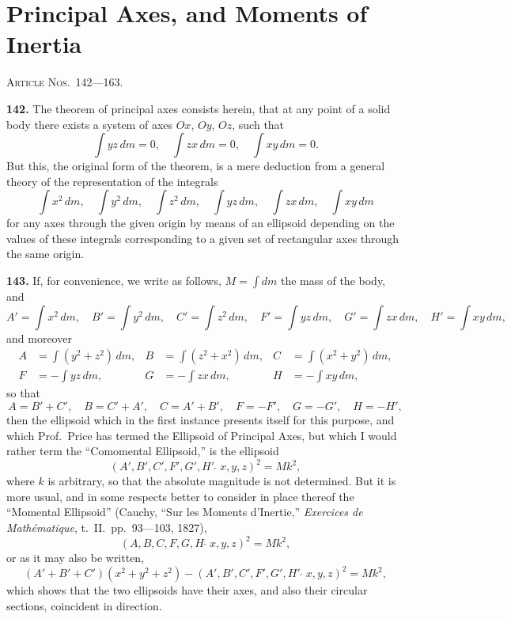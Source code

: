 \documentclass[11pt,a4paper]{article}
\theoremstyle{definition}
\begin{document}
\section*{Principal Axes, and Moments of Inertia}
\noindent\textsc{Article Nos.~142---163.}

\medskip

\textbf{142.} The theorem of principal axes consists herein, that at any point of a solid body there exists a system of axes $Ox$, $Oy$, $Oz$, such that
\[
\int yz\,dm = 0, \quad \int zx\,dm = 0, \quad \int xy\,dm = 0.
\]
But this, the original form of the theorem, is a mere deduction from a general theory of the representation of the integrals
\[
\int x^2\,dm, \quad \int y^2\,dm, \quad \int z^2\,dm, \quad \int yz\,dm, \quad \int zx\,dm, \quad \int xy\,dm
\]
for any axes through the given origin by means of an ellipsoid depending on the values of these integrals corresponding to a given set of rectangular axes through the same origin.

\textbf{143.} If, for convenience, we write as follows, $M = \int dm$ the mass of the body, and
\[
A' = \int x^2\,dm, \quad B' = \int y^2\,dm, \quad C' = \int z^2\,dm, \quad F' = \int yz\,dm, \quad G' = \int zx\,dm, \quad H' = \int xy\,dm,
\]
and moreover
\begin{align*}
A &= \int(y^2 + z^2)\,dm, & B &= \int(z^2 + x^2)\,dm, & C &= \int(x^2 + y^2)\,dm, \\
F &= -\int yz\,dm, & G &= -\int zx\,dm, & H &= -\int xy\,dm,
\end{align*}
so that
\[
A = B' + C', \quad B = C' + A', \quad C = A' + B', \quad F = -F', \quad G = -G', \quad H = -H',
\]
then the ellipsoid which in the first instance presents itself for this purpose, and which Prof.~Price has termed the Ellipsoid of Principal Axes, but which I would rather term the ``Comomental Ellipsoid,'' is the ellipsoid
\[
(A', B', C', F', G', H'\,\widehat{\,}\,x, y, z)^2 = Mk^2,
\]
where $k$ is arbitrary, so that the absolute magnitude is not determined. But it is more usual, and in some respects better to consider in place thereof the ``Momental Ellipsoid'' (Cauchy, ``Sur les Moments d'Inertie,'' \textit{Exercices de Math\'ematique}, t.~II.\ pp.~93---103, 1827),
\[
(A, B, C, F, G, H\,\widehat{\,}\,x, y, z)^2 = Mk^2,
\]
or as it may also be written,
\[
(A' + B' + C')(x^2 + y^2 + z^2) - (A', B', C', F', G', H'\,\widehat{\,}\,x, y, z)^2 = Mk^2,
\]
which shows that the two ellipsoids have their axes, and also their circular sections, coincident in direction.
\end{document}

